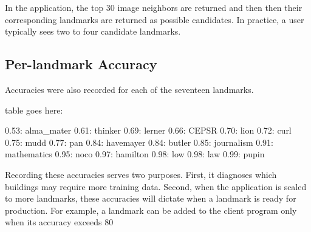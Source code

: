 In the application, the top 30 image neighbors are returned and then then their corresponding landmarks are returned as possible candidates. In practice, a user typically sees two to four candidate landmarks.

\subsection{Per-landmark Accuracy}

Accuracies were also recorded for each of the seventeen landmarks.

table goes here:

0.53: alma_mater
0.61: thinker
0.69: lerner
0.66: CEPSR
0.70: lion
0.72: curl
0.75: mudd
0.77: pan
0.84: havemayer
0.84: butler
0.85: journalism
0.91: mathematics
0.95: noco
0.97: hamilton
0.98: low
0.98: law
0.99: pupin

Recording these accuracies serves two purposes. First, it diagnoses which buildings may require more training data. Second, when the application is scaled to more landmarks, these accuracies will dictate when a landmark is ready for production. For example, a landmark can be added to the client program only when its accuracy exceeds 80%

